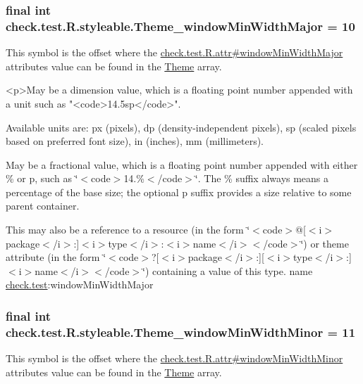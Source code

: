 \subsubsection[{Theme\+\_\+window\+Min\+Width\+Major}]{\setlength{\rightskip}{0pt plus 5cm}final int check.\+test.\+R.\+styleable.\+Theme\+\_\+window\+Min\+Width\+Major = 10\hspace{0.3cm}{\ttfamily [static]}}\label{classcheck_1_1test_1_1_r_1_1styleable_affa53ed5805b4fc7b71d664cddc7b88e}
This symbol is the offset where the \hyperlink{classcheck_1_1test_1_1_r_1_1attr_ad36e3ab0bb3027c715b3ab1e256f0def}{check.\+test.\+R.\+attr\#window\+Min\+Width\+Major} attribute\textquotesingle{}s value can be found in the \hyperlink{classcheck_1_1test_1_1_r_1_1styleable_acca726d02016a0cf607782ec3a436a81}{Theme} array.

\begin{DoxyVerb}      <p>May be a dimension value, which is a floating point number appended with a unit such as "<code>14.5sp</code>".
\end{DoxyVerb}
 Available units are\+: px (pixels), dp (density-\/independent pixels), sp (scaled pixels based on preferred font size), in (inches), mm (millimeters). 

May be a fractional value, which is a floating point number appended with either \% or p, such as \char`\"{}$<$code$>$14.\%$<$/code$>$\char`\"{}. The \% suffix always means a percentage of the base size; the optional p suffix provides a size relative to some parent container. 

This may also be a reference to a resource (in the form \char`\"{}$<$code$>$@\mbox{[}$<$i$>$package$<$/i$>$\+:\mbox{]}$<$i$>$type$<$/i$>$\+:$<$i$>$name$<$/i$>$$<$/code$>$\char`\"{}) or theme attribute (in the form \char`\"{}$<$code$>$?\mbox{[}$<$i$>$package$<$/i$>$\+:\mbox{]}\mbox{[}$<$i$>$type$<$/i$>$\+:\mbox{]}$<$i$>$name$<$/i$>$$<$/code$>$\char`\"{}) containing a value of this type.  name \hyperlink{namespacecheck_1_1test}{check.\+test}\+:window\+Min\+Width\+Major \hypertarget{classcheck_1_1test_1_1_r_1_1styleable_aa7f575c9c5c290ba568031edf16a3bc6}{}
\subsubsection[{Theme\+\_\+window\+Min\+Width\+Minor}]{\setlength{\rightskip}{0pt plus 5cm}final int check.\+test.\+R.\+styleable.\+Theme\+\_\+window\+Min\+Width\+Minor = 11\hspace{0.3cm}{\ttfamily [static]}}\label{classcheck_1_1test_1_1_r_1_1styleable_aa7f575c9c5c290ba568031edf16a3bc6}
This symbol is the offset where the \hyperlink{classcheck_1_1test_1_1_r_1_1attr_acc028cfe18328eb830afb880f3d7b3ad}{check.\+test.\+R.\+attr\#window\+Min\+Width\+Minor} attribute\textquotesingle{}s value can be found in the \hyperlink{classcheck_1_1test_1_1_r_1_1styleable_acca726d02016a0cf607782ec3a436a81}{Theme} array.

